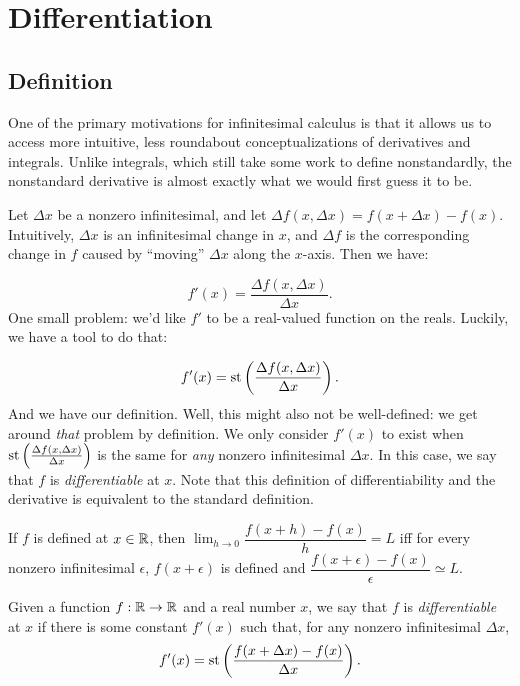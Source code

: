 \section{Differentiation}\label{sec:Differentiation}
\subsection{Definition}
One of the primary motivations for infinitesimal calculus is that it allows us to access more intuitive, less roundabout conceptualizations of derivatives and integrals. Unlike integrals, which still take some work to define nonstandardly, the nonstandard derivative is almost exactly what we would first guess it to be.

Let $\Delta x$ be a nonzero infinitesimal, and let $\Delta f (x, \Delta x) = f(x + \Delta x) - f(x)$. Intuitively, $\Delta x$ is an infinitesimal change in $x$, and $\Delta f$ is the corresponding change in $f$ caused by ``moving'' $\Delta x$ along the $x$-axis. Then we have:

\[ f'(x) = \frac{\Delta f(x, \Delta x)}{\Delta x}. \]
One small problem: we'd like $f'$ to be a real-valued function on the reals. Luckily, we have a tool to do that:

\[ f'(x) = \operatorname{st}\left(\frac{\Delta f(x, \Delta x)}{\Delta x}\right). \]
And we have our definition. Well, this might also not be well-defined: we get around \textit{that} problem by definition. We only consider $f'(x)$ to exist when $\operatorname{st}\left(\frac{\Delta f(x, \Delta x)}{\Delta x}\right)$ is the same for \textit{any} nonzero infinitesimal $\Delta x$. In this case, we say that $f$ is \textit{differentiable} at $x$. Note that this definition of differentiability and the derivative is equivalent to the standard definition.

\begin{thm}\label{nonStandardDerivEquivalent}
    If $f$ is defined at $x \in \mathbb{R}$, then $\displaystyle{\lim_{h\to 0}} \dfrac{f(x + h) - f(x)}{h} = L$ iff for every nonzero infinitesimal $\epsilon$, $f(x + \epsilon)$ is defined and $\dfrac{f(x + \epsilon) - f(x)}{\epsilon} \simeq L$.
\end{thm}

\begin{defn}
    Given a function $f: \mathbb{R} \to \mathbb{R}$ and a real number $x$, we say that $f$ is \textit{differentiable} at $x$ if there is some constant $f'(x)$ such that, for any nonzero infinitesimal $\Delta x$,
    \[f'(x) = \operatorname{st}\left(\frac{f(x + \Delta x) - f(x)}{\Delta x}\right).\]
\end{defn}

